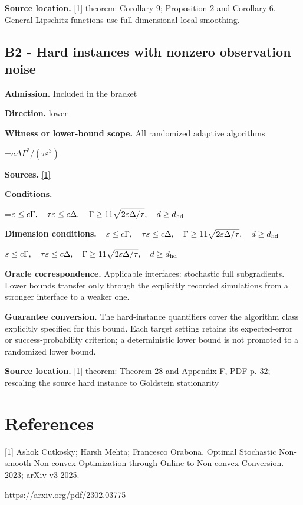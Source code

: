 \documentclass[10pt,a4paper]{article}
\newcommand{\AtlasMath}[1]{\par\begingroup\centering\setbox0=\hbox{$\displaystyle #1$}\ifdim\wd0>1.4\linewidth\typeout{ATLAS WIDE FORMULA: \the\wd0}\fi\ifdim\wd0>\linewidth\resizebox{\linewidth}{!}{\box0}\else\box0\fi\par\endgroup}
\newcommand{\AtlasInlineMath}[1]{\begingroup\setbox0=\hbox{$#1$}\ifdim\wd0>.4\linewidth\endgroup\AtlasMath{#1}\else\endgroup$#1$\fi}
\begin{document}
\textbf{Source location.} \href{https://arxiv.org/pdf/2302.03775}{[1]} theorem: Corollary 9; Proposition 2 and Corollary 6. General Lipschitz functions use full-dimensional local smoothing.

\subsection{B2 - Hard instances with nonzero observation noise}
\textbf{Admission.} Included in the bracket

\textbf{Direction.} lower

\textbf{Witness or lower-bound scope.} All randomized adaptive algorithms

\AtlasMath{c\Delta\Gamma^2/(\tau\varepsilon^3)}
\textbf{Sources.} \href{https://arxiv.org/pdf/2302.03775}{[1]}

\textbf{Conditions.} 
\AtlasMath{\varepsilon\le c\Gamma,\quad\tau\varepsilon\le c\Delta,\quad\Gamma\ge11\sqrt{2\varepsilon\Delta/\tau},\quad d\ge d_{\rm hd}}


\textbf{Dimension conditions.} \AtlasInlineMath{\varepsilon\le c\Gamma,\quad\tau\varepsilon\le c\Delta,\quad\Gamma\ge11\sqrt{2\varepsilon\Delta/\tau},\quad d\ge d_{\rm hd}}

\textbf{Oracle correspondence.} Applicable interfaces: stochastic full subgradients. Lower bounds transfer only through the explicitly recorded simulations from a stronger interface to a weaker one.

\textbf{Guarantee conversion.} The hard-instance quantifiers cover the algorithm class explicitly specified for this bound. Each target setting retains its expected-error or success-probability criterion; a deterministic lower bound is not promoted to a randomized lower bound.

\textbf{Source location.} \href{https://arxiv.org/pdf/2302.03775}{[1]} theorem: Theorem 28 and Appendix F, PDF p. 32; rescaling the source hard instance to Goldstein stationarity

\section{References}
[1] Ashok Cutkosky; Harsh Mehta; Francesco Orabona. Optimal Stochastic Non-smooth Non-convex Optimization through Online-to-Non-convex Conversion. 2023; arXiv v3 2025.

\url{https://arxiv.org/pdf/2302.03775}
\end{document}
